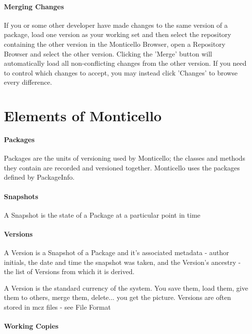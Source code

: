 \documentclass[a4paper,10pt,twoside]{book}
\begin{document}
\paragraph{Merging Changes}

If you or some other developer have made changes to the same version of a package, load one version as your working set and then select the repository containing the other version in the Monticello Browser, open a Repository Browser and select the other version. Clicking the 'Merge' button will automatically load all non-conflicting changes from the other version. If you need to control which changes to accept, you may instead click 'Changes' to browse every difference.



\section{Elements of Monticello}

\paragraph{Packages}

Packages are the units of versioning used by Monticello; the classes and methods they contain are recorded and versioned together. Monticello uses the packages defined by PackageInfo.

\paragraph{Snapshots}

A Snapshot is the state of a Package at a particular point in time

\paragraph{Versions}

A Version is a Snapshot of a Package and it's associated metadata - author initials, the date and time the snapshot was taken, and the Version's ancestry - the list of Versions from which it is derived.

A Version is the standard currency of the system. You save them, load them, give them to others, merge them, delete... you get the picture. Versions are often stored in mcz files - see File Format

\paragraph{Working Copies}
\end{document}
